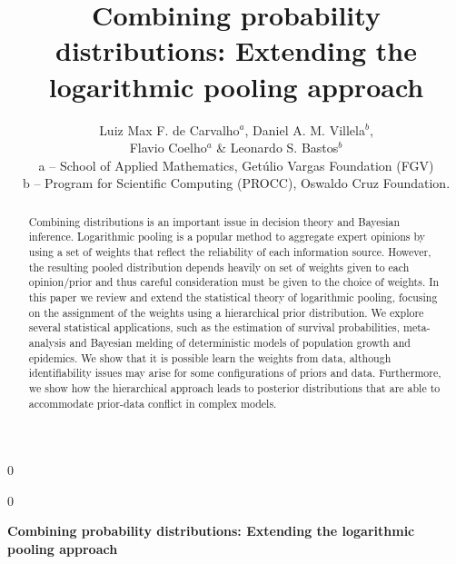 \documentclass[12pt]{article}
\newcommand{\blind}{0}
\begin{document}
%

\def\spacingset#1{\renewcommand{\baselinestretch}%
{#1}\small\normalsize} \spacingset{1}



\blind
{
  \title{\bf Combining probability distributions: Extending the logarithmic pooling approach}
    \author{
Luiz Max F. de Carvalho$^{a}$, Daniel A. M. Villela$^b$,\\
Flavio Coelho$^a$ \& Leonardo S. Bastos$^b$ \\
a -- School of Applied Mathematics, Get\'ulio Vargas Foundation (FGV)\\
b -- Program for Scientific Computing (PROCC), Oswaldo Cruz Foundation. \\
}
  \maketitle
} \fi

\blind
{
  \bigskip
  \bigskip
  \bigskip
  \begin{center}
    {\LARGE\bf Combining probability distributions: Extending the logarithmic pooling approach}
\end{center}
  \medskip
} \fi

\bigskip
\begin{abstract}
Combining distributions is an important issue in decision theory and Bayesian inference.
Logarithmic pooling is a popular method to aggregate expert opinions by using a set of weights that reflect the reliability of each information source.
However, the resulting pooled distribution depends heavily on set of weights given to each opinion/prior and thus careful consideration must be given to the choice of weights.
In this paper we review and extend the statistical theory of logarithmic pooling, focusing on the assignment of the weights using a hierarchical prior distribution. 
We explore several statistical applications, such as the estimation of survival probabilities, meta-analysis and Bayesian melding of deterministic models of population growth and epidemics.
We show that it is possible learn the weights from data, although identifiability issues may arise for some configurations of priors and data.
Furthermore, we show how the hierarchical approach leads to posterior distributions that are able to accommodate prior-data conflict in complex models.
\end{abstract}
\end{document}
